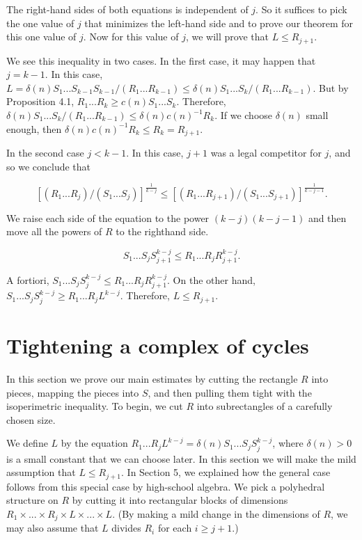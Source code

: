 \documentclass{amsart}
\newtheorem*{Theorem 1}{Theorem 1}
\newtheorem*{Theorem 2}{Theorem 2}
\newtheorem*{Estimate 1}{Estimate 1}
\newtheorem*{Estimate 2}{Estimate 2}
\newtheorem*{key lemma}{Key Lemma}
\numberwithin{equation}{section}
\begin{document}
The right-hand sides of both equations is independent of $j$.  So
it suffices to pick the one value of $j$ that minimizes the
left-hand side and to prove our theorem for this one value of
$j$.  Now for this value of $j$, we will prove that $L \le
R_{j+1}$. 

We see this inequality in two cases.  In the first case, it may
happen that $j = k-1$.  In this case, $L = \delta(n) S_1 ...
S_{k-1} S_{k-1} / (R_1... R_{k-1}) \le \delta(n) S_1 ... S_k /
(R_1 ... R_{k-1})$.  But by Proposition 4.1, $R_1 ... R_k \ge
c(n) S_1 ... S_k$.  Therefore, $\delta(n) S_1 ... S_k / (R_1 ...
R_{k-1}) \le \delta(n) c(n)^{-1} R_k$. If we choose $\delta(n)$
small enough, then $\delta(n) c(n)^{-1} R_k
\le R_k = R_{j+1}$.

In the second case $j < k-1$.  In this case, $j+1$ was a legal
competitor for $j$, and so we conclude that

$$[(R_1 ... R_j)/(S_1 ... S_j)]^{\frac{1}{k-j}} \le [(R_1 ...
R_{j+1})/(S_1 ... S_{j+1})]^{\frac{1}{k-j-1}}.$$

We raise each side of the equation to the power $(k-j)(k-j-1)$
and then move all the powers of $R$ to the righthand side.

$$S_1 ... S_j S_{j+1}^{k-j} \le R_1 ... R_j R_{j+1}^{k-j}.$$

A fortiori, $S_1... S_j S_j^{k-j} \le R_1 ... R_j R_{j+1}^{k-j}$.   
On the other hand, $S_1 ... S_j S_j^{k-j} \ge R_1 ... R_j L^{k-j}$.  
Therefore, $L \le R_{j+1}$.



\section{Tightening a complex of cycles}

In this section we prove our main estimates by cutting the
rectangle $R$ into pieces, mapping the pieces into $S$, and then
pulling them tight with the isoperimetric inequality.  To begin,
we cut $R$ into subrectangles of a carefully chosen size.

We define $L$ by the equation $R_1 ... R_j L^{k-j} =
\delta(n) S_1 ... S_j S_j^{k-j}$, where $\delta(n) > 0$ is a
small constant that we can choose later.  In this section we will
make the mild assumption that $L \le R_{j+1}$.  In Section 5, we
explained how the general case follows from this special case by
high-school algebra.  We pick a polyhedral structure on $R$ by
cutting it into rectangular blocks of dimensions $R_1 \times ...
\times R_j \times L \times ... \times L$.  (By making a mild
change in the dimensions of $R$, we may also assume that $L$
divides $R_i$ for each $i \ge j+1$.)
\end{document}
